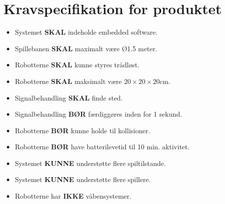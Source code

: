 \section{Kravspecifikation for produktet}

\begin{itemize}
    \item Systemet \textbf{SKAL} indeholde embedded software.
    \item Spillebanen \textbf{SKAL} maximalt være Ø1.5 meter.
    \item Robotterne \textbf{SKAL} kunne styres trådløst.
    \item Robotterne \textbf{SKAL} maksimalt være $20 \times 20 \times 20$cm.
    \item Signalbehandling \textbf{SKAL} finde sted. 
    \item Signalbehandling \textbf{BØR} færdiggøres inden for 1 sekund.
    \item Robotterne \textbf{BØR} kunne holde til kollisioner.
    \item Robotterne \textbf{BØR} have batterilevetid til 10 min. aktivitet.
    \item Systemet \textbf{KUNNE} understøtte flere spiltilstande.
    \item Systemet \textbf{KUNNE} understøtte flere spillere.
    \item Robotterne har \textbf{IKKE} våbensystemer.
\end{itemize}